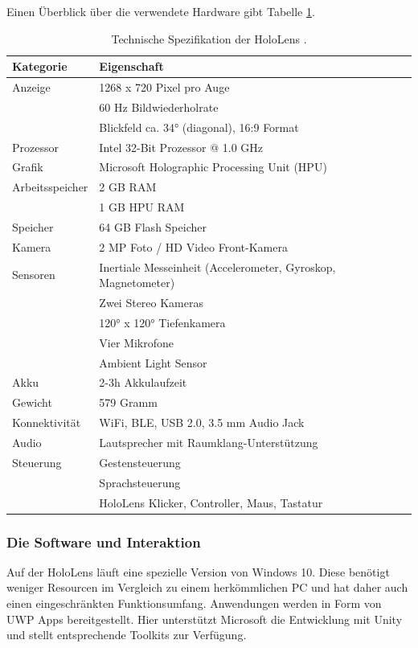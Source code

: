 Einen Überblick über die verwendete Hardware gibt Tabelle \ref{tab:hololens_tech_details}.

\bgroup
\setlength\extrarowheight{0pt}
\def\arraystretch{1.25}
\begin{table}[h!]
	\centering
	\begin{tabular}{l|l}
		Kategorie & Eigenschaft\\
		\hline
		\hline
		Anzeige & 1268 x 720 Pixel pro Auge\\
		& 60 Hz Bildwiederholrate\\
		& Blickfeld ca. 34° (diagonal), 16:9 Format\\
		\hline
		Prozessor & Intel 32-Bit Prozessor @ 1.0 GHz\\
		\hline
		Grafik & Microsoft Holographic Processing Unit (HPU)\\
		\hline
		Arbeitsspeicher & 2 GB RAM\\
		& 1 GB HPU RAM\\
		\hline
		Speicher & 64 GB Flash Speicher\\
		\hline
		Kamera & 2 MP Foto / HD Video Front-Kamera\\
		\hline
		Sensoren & Inertiale Messeinheit (Accelerometer, Gyroskop, Magnetometer) \\
		& Zwei Stereo Kameras\\
		& 120° x 120° Tiefenkamera\\
		& Vier Mikrofone\\
		& Ambient Light Sensor\\
		\hline
		Akku & 2-3h Akkulaufzeit \\
		\hline
		Gewicht & 579 Gramm \\
		\hline
		Konnektivität & WiFi, BLE, USB 2.0, 3.5 mm Audio Jack \\
		\hline
		Audio & Lautsprecher mit Raumklang-Unterstützung\\
		\hline
		Steuerung & Gestensteuerung\\
		& Sprachsteuerung\\
		& HoloLens Klicker, Controller, Maus, Tastatur\\
	\end{tabular}\caption{\label{tab:hololens_tech_details} Technische Spezifikation der HoloLens \cite{MRDoc}.}
\end{table}
\egroup

\subsubsection{Die Software und Interaktion}
\label{sec-2-1-3}
Auf der HoloLens läuft eine spezielle Version von Windows 10. Diese benötigt weniger Resourcen im Vergleich zu einem herkömmlichen PC und hat daher auch einen eingeschränkten Funktionsumfang. Anwendungen werden in Form von UWP Apps bereitgestellt. Hier unterstützt Microsoft die Entwicklung mit Unity und stellt entsprechende Toolkits zur Verfügung.\\

